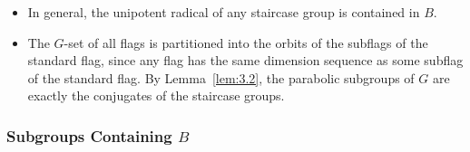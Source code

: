 \documentclass[../Odyssey_Project.tex]{subfiles}
\begin{document}
\begin{itemize}
\[\begin{pmatrix}
            0 & 0 & 0 & * & * & * \\
            0 & 0 & 0 & * & * & * \\
            0 & 0 & 0 & * & * & *
        \end{pmatrix},
    \]
    isomorphic with $\mathrm{GL}(2, F) \times \mathrm{GL}(1, F) \times \mathrm{GL}(3, F)$.
    \item In general, the unipotent radical of any staircase group is contained in $B$.
    \item The $G$-set of all flags is partitioned into the orbits of the subflags of the standard flag, since any flag has the same dimension sequence as some subflag of the standard flag. By Lemma~\ref{lem:3.2}, the parabolic subgroups of $G$ are exactly the conjugates of the staircase groups.
\end{itemize}

\subsubsection*{Subgroups Containing $B$}
\end{document}
